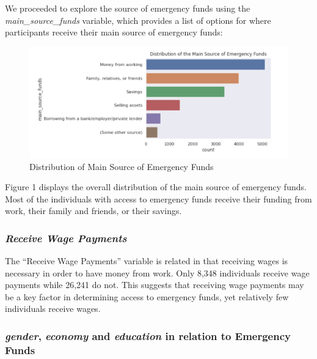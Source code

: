 \documentclass[water,article,submit,moreauthors,pdftex]{mdpi}
\begin{document}
We proceeded to explore the source of emergency funds using the
\emph{main\_source\_funds} variable, which provides a list of options
for where participants receive their main source of emergency funds:

\begin{figure}
\centering
\includegraphics[width=\textwidth,height=0.5\textheight]{images/MainSourceFunds.png}
\caption{Distribution of Main Source of Emergency Funds}
\end{figure}

Figure 1 displays the overall distribution of the main source of
emergency funds. Most of the individuals with access to emergency funds
receive their funding from work, their family and friends, or their
savings.

\hypertarget{receive-wage-payments}{%
\subsubsection{\texorpdfstring{\emph{Receive Wage
Payments}}{Receive Wage Payments}}\label{receive-wage-payments}}

The ``Receive Wage Payments'' variable is related in that receiving
wages is necessary in order to have money from work. Only 8,348
individuals receive wage payments while 26,241 do not. This suggests
that receiving wage payments may be a key factor in determining access
to emergency funds, yet relatively few individuals receive wages.

\hypertarget{gender-economy-and-education-in-relation-to-emergency-funds}{%
\subsubsection{\texorpdfstring{\emph{gender}, \emph{economy} and
\emph{education} in relation to Emergency
Funds}{gender, economy and education in relation to Emergency Funds}}\label{gender-economy-and-education-in-relation-to-emergency-funds}}
\end{document}
